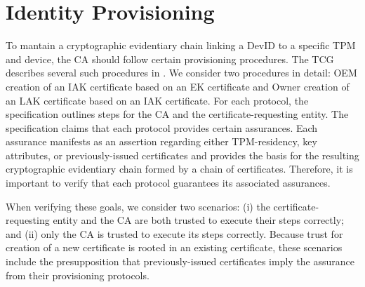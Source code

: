 \documentclass[runningheads]{llncs}
\begin{document}
  

%
%
%
\section{Identity Provisioning}

To mantain a cryptographic evidentiary chain linking a DevID to a
specific TPM and device, the CA should follow certain provisioning
procedures. The TCG describes several such procedures in
\citet{DevIDSpec-TCG}.  We consider two procedures in detail: OEM
creation of an IAK certificate based on an EK certificate and Owner
creation of an LAK certificate based on an IAK certificate.  For each
protocol, the specification outlines steps for the CA and the
certificate-requesting entity.  The specification claims that each
protocol provides certain assurances.  Each assurance manifests as an
assertion regarding either TPM-residency, key attributes, or
previously-issued certificates and provides the basis for the
resulting cryptographic evidentiary chain formed by a chain of
certificates. Therefore, it is important to verify that each protocol
guarantees its associated assurances.

When verifying these goals, we consider two scenarios: (i) the
certificate-requesting entity and the CA are both trusted to execute
their steps correctly; and (ii) only the CA is trusted to execute its
steps correctly.  Because trust for creation of a new certificate is
rooted in an existing certificate, these scenarios include the
presupposition that previously-issued certificates imply the assurance
from their provisioning protocols.
\end{document}
